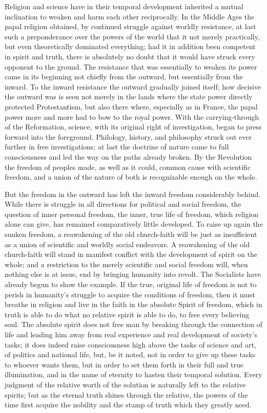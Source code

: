 \documentclass[12pt]{book}
\begin{document}
Religion and science have in their temporal development inherited a mutual inclination to weaken and
harm each other reciprocally. In the Middle Ages the papal religion obtained, by continued struggle
against worldly resistance, at last such a preponderance over the powers of the world that it not
merely practically, but even theoretically dominated everything; had it in addition been competent
in spirit and truth, there is absolutely no doubt that it would have struck every opponent to the
ground. The resistance that was essentially to weaken its power came in its beginning not chiefly
from the outward, but essentially from the inward. To the inward resistance the outward gradually
joined itself; how decisive the outward was is seen not merely in the lands where the state power
directly protected Protestantism, but also there where, especially as in France, the papal power
more and more had to bow to the royal power. With the carrying-through of the Reformation, science,
with its original right of investigation, began to press forward into the foreground. Philology,
history, and philosophy struck out ever further in free investigations; at last the doctrine of
nature came to full consciousness and led the way on the paths already broken. By the Revolution
the freedom of peoples made, as well as it could, common cause with scientific freedom, and a union
of the nature of both is recognizable enough on the whole.

But the freedom in the outward has left the inward freedom considerably behind. While there is
struggle in all directions for political and social freedom, the question of inner personal freedom,
the inner, true life of freedom, which religion alone can give, has remained comparatively little
developed. To raise up again the sunken freedom, a reawakening of the old church-faith will be just
as insufficient as a union of scientific and worldly social endeavors. A reawakening of the old
church-faith will stand in manifest conflict with the development of spirit on the whole; and a
restriction to the merely scientific and social freedom will, when nothing else is at issue, end by
bringing humanity into revolt. The Socialists have already begun to show the example. If the true,
original life of freedom is not to perish in humanity's struggle to acquire the conditions of
freedom, then it must breathe in religion and live in the faith in the absolute Spirit of freedom,
which in truth is able to do what no relative spirit is able to do, to free every believing soul.
The absolute spirit does not free man by breaking through the connection of life and leading him
away from real experience and real development of society's tasks; it does indeed raise
consciousness high above the tasks of science and art, of politics and national life, but, be it
noted, not in order to give up these tasks to whoever wants them, but in order to set them forth in
their full and true illumination, and in the name of eternity to hasten their temporal solution.
Every judgment of the relative worth of the solution is naturally left to the relative spirits; but
as the eternal truth shines through the relative, the powers of the time first acquire the nobility
and the stamp of truth which they greatly need.
\end{document}
